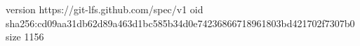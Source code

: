 version https://git-lfs.github.com/spec/v1
oid sha256:cd09aa31db62d89a463d1bc585b34d0e74236866718961803bd421702f7307b0
size 1156
